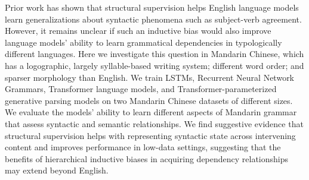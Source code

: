Prior work has shown that structural supervision helps English language models learn generalizations about syntactic phenomena such as subject-verb agreement. However, it remains unclear if such an inductive bias would also improve language models' ability to learn grammatical dependencies in typologically different languages. Here we investigate this question in Mandarin Chinese, which has a logographic, largely syllable-based writing system; different word order; and sparser morphology than English. We train LSTMs, Recurrent Neural Network Grammars, Transformer language models, and Transformer-parameterized generative parsing models on two Mandarin Chinese datasets of different sizes. We evaluate the models' ability to learn different aspects of Mandarin grammar that assess syntactic and semantic relationships. We find suggestive evidence that structural supervision helps with representing syntactic state across intervening content and improves performance in low-data settings, suggesting that the benefits of hierarchical inductive biases in acquiring dependency relationships may extend beyond English.
